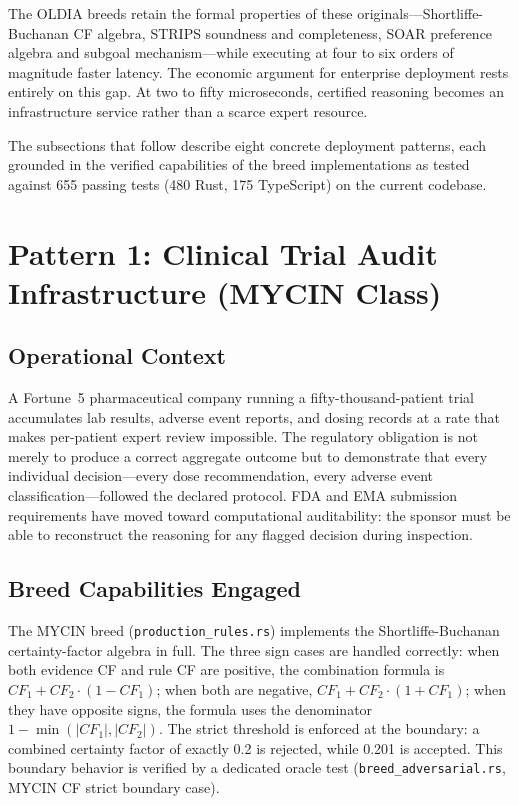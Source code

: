 The OLDIA breeds retain the formal properties of these originals---Shortliffe-Buchanan
CF algebra, STRIPS soundness and completeness, SOAR preference algebra and subgoal
mechanism---while executing at four to six orders of magnitude faster latency. The
economic argument for enterprise deployment rests entirely on this gap. At two to
fifty microseconds, certified reasoning becomes an infrastructure service rather than
a scarce expert resource.

The subsections that follow describe eight concrete deployment patterns, each grounded
in the verified capabilities of the breed implementations as tested against 655 passing
tests (480 Rust, 175 TypeScript) on the current codebase.

\section{Pattern 1: Clinical Trial Audit Infrastructure (MYCIN Class)}
\label{sec:mycin-deployment}

\subsection*{Operational Context}

A Fortune~5 pharmaceutical company running a fifty-thousand-patient trial accumulates
lab results, adverse event reports, and dosing records at a rate that makes
per-patient expert review impossible. The regulatory obligation is not merely to
produce a correct aggregate outcome but to demonstrate that every individual
decision---every dose recommendation, every adverse event classification---followed
the declared protocol. FDA and EMA submission requirements have moved toward
computational auditability: the sponsor must be able to reconstruct the reasoning
for any flagged decision during inspection.

\subsection*{Breed Capabilities Engaged}

The MYCIN breed (\texttt{production\_rules.rs}) implements the Shortliffe-Buchanan
certainty-factor algebra in full. The three sign cases are handled correctly: when
both evidence CF and rule CF are positive, the combination formula is
$CF_1 + CF_2 \cdot (1 - CF_1)$; when both are negative,
$CF_1 + CF_2 \cdot (1 + CF_1)$; when they have opposite signs, the formula uses
the denominator $1 - \min(|CF_1|, |CF_2|)$. The strict threshold is enforced at
the boundary: a combined certainty factor of exactly 0.2 is rejected, while 0.201
is accepted. This boundary behavior is verified by a dedicated oracle test
(\texttt{breed\_adversarial.rs}, MYCIN CF strict boundary case).

